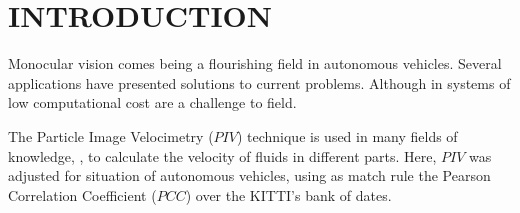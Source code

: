 \section{INTRODUCTION}

Monocular vision comes being a flourishing field in autonomous vehicles. 
Several applications have presented solutions to current problems. 
Although in systems  of low computational cost  are a challenge to field. 


The Particle Image Velocimetry ($PIV$)\cite{Bastiaans} technique is used in many fields of 
knowledge, \cite{Story, Xu}, to calculate the velocity of fluids in different parts. 
Here, $PIV$ was adjusted for situation of autonomous vehicles, using as match rule 
the Pearson Correlation Coefficient ($PCC$)\cite{Miranda Neto} over the KITTI's 
bank of dates\cite{Geiger}.


